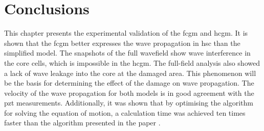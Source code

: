 \section{Conclusions}
\label{sec:conclusionsValid}

This chapter presents the experimental validation of the \ac{fcgm} and \ac{hcgm}.
It is shown that the \ac{fcgm} better expresses the wave propagation in \ac{hsc} than the simplified model.
The snapshots of the full wavefield show wave interference in the core cells, which is impossible in the \ac{hcgm}.
The full-field analysis also showed a lack of wave leakage into the core at the damaged area.
This phenomenon will be the basis for determining the effect of the damage on wave propagation.
The velocity of the wave propagation for both models is in good agreement with the \ac{pzt} measurements.
Additionally, it was shown that by optimising the algorithm for solving the equation of motion, a calculation time was achieved ten times faster than the algorithm presented in the paper \cite{kudela2020parallel}.